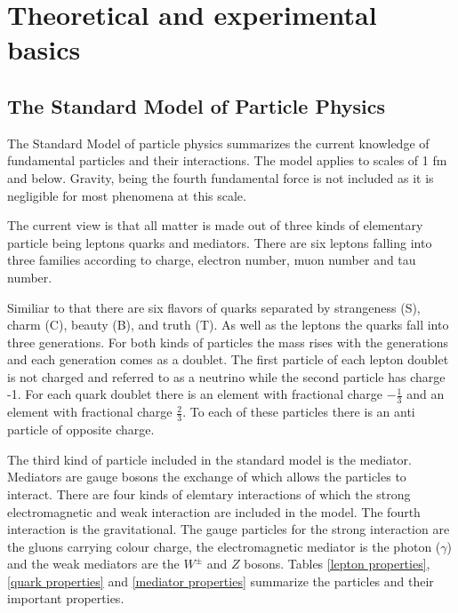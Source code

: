 \chapter{Theoretical and experimental basics}
\label{theory}

\section{The Standard Model of Particle Physics}

The Standard Model of particle physics summarizes the current knowledge of fundamental particles and their interactions. The model applies to scales of 1 fm and below. Gravity, being the fourth fundamental force is not included as it is negligible for most phenomena at this scale.

The current view is that all matter is made out of three kinds of elementary particle being leptons quarks and mediators.
There are six leptons falling into three families according to charge, electron number, muon number and tau number. 

Similiar to that there are six flavors of quarks separated by strangeness (S), charm (C), beauty (B), and truth (T). As well as the leptons the quarks fall into three generations.
For both kinds of particles the mass rises with the generations and each generation comes as a doublet. The first particle of each lepton doublet is not charged and referred to as a neutrino while the second particle has charge -1.
For each quark doublet there is an element with fractional charge $-\frac{1}{3}$ and an element with fractional charge $\frac{2}{3}$.
To each of these particles there is an anti particle of opposite charge.

The third kind of particle included in the standard model is the mediator. Mediators are gauge bosons the exchange of which allows the particles to interact. There are four kinds of elemtary interactions of which the strong electromagnetic and weak interaction are included in the model. The fourth interaction is the gravitational.
The gauge particles for the strong interaction are the gluons carrying colour charge, the electromagnetic mediator is the photon ($\gamma$) and the weak mediators are the $W^{\pm}$ and $Z$ bosons.
Tables \ref{lepton properties}, \ref{quark properties} and \ref{mediator properties} summarize the particles and their important properties.
\newpage


